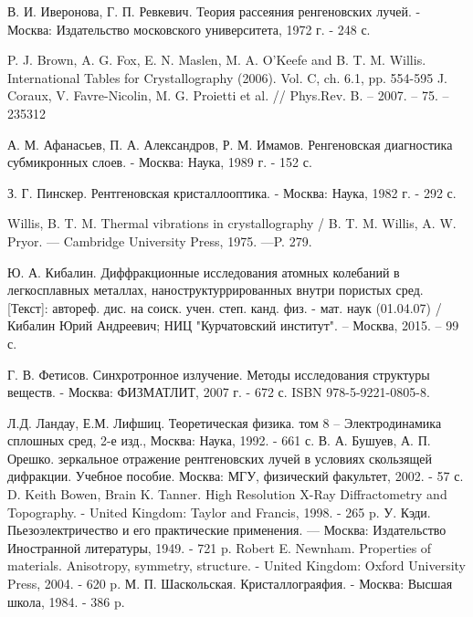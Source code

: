 \begin{thebibliography}{99}

  В. И.  Иверонова, Г. П. Ревкевич. Теория рассеяния ренгеновских лучей. -
  Москва: Издательство московского университета, 1972 г. - 248 с.

  P. J. Brown, A. G. Fox, E. N. Maslen, M. A. O'Keefe and B. T. M. Willis.
  International Tables for Crystallography (2006). Vol. C, ch. 6.1, pp. 554-595
J. Coraux, V. Favre-Nicolin, M. G. Proietti et al. // Phys.Rev. B. – 2007. – 75. – 235312

  А. М. Афанасьев, П. А. Александров, Р. М. Имамов. Ренгеновская диагностика
  субмикронных слоев. - Москва: Наука, 1989 г. - 152 с.

  З. Г.  Пинскер. Рентгеновская кристаллооптика. - Москва: Наука, 1982 г. - 292 с.


  Willis, B. T. M. Thermal vibrations in crystallography /
  B. T. M. Willis, A. W. Pryor. — Cambridge University Press, 1975. —P. 279.

  Ю. А. Кибалин. Диффракционные исследования атомных колебаний в легкосплавных
  металлах, наноструктуррированных внутри пористых сред. [Текст]: автореф. дис. на соиск.
   учен. степ. канд. физ. - мат. наук (01.04.07) /
   Кибалин Юрий Андреевич; НИЦ "Курчатовский институт". – Москва, 2015. – 99 с.

  Г. В. Фетисов. Синхротронное излучение. Методы исследования структуры веществ. -
  Москва: ФИЗМАТЛИТ, 2007 г. - 672 с. ISBN 978-5-9221-0805-8.

 Л.Д. Ландау, Е.М. Лифшиц. Теоретическая физика. том 8 –
 Электродинамика сплошных сред, 2-е изд., Москва: Наука, 1992. - 661 с.
 В. А. Бушуев, А. П. Орешко. зеркальное отражение рентгеновских лучей в условиях скользящей дифракции.
 Учебное пособие. Москва: МГУ, физический факультет, 2002. - 57 с.
 D. Keith Bowen, Brain K. Tanner. High Resolution X-Ray Diffractometry and Topography. - United Kingdom: Taylor and Francis, 1998. - 265 p.
 У. Кэди. Пьезоэлектричество и его практические применения. — Москва: Издательство Иностранной литературы, 1949. - 721 p.
  Robert E. Newnham. Properties of materials. Anisotropy, symmetry, structure. - United Kingdom: Oxford University Press, 2004. -  620 p.
  М. П. Шаскольская. Кристаллограяфия. - Москва: Высшая школа, 1984. - 386 p.


\end{thebibliography}
